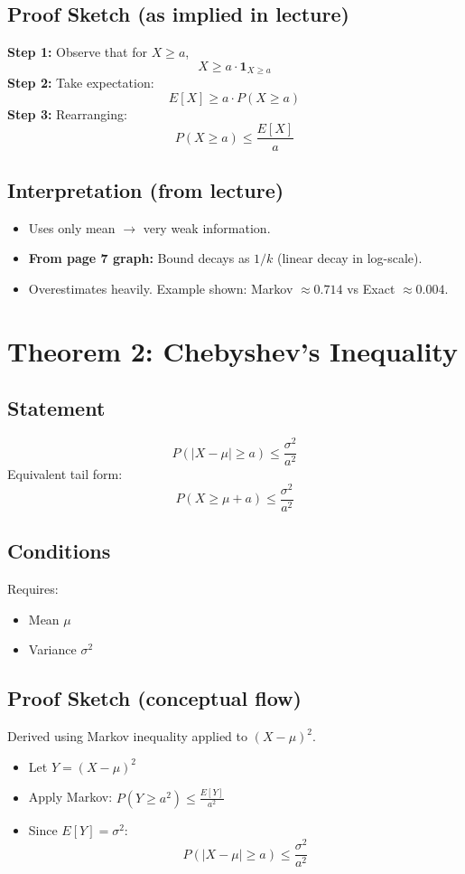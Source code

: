 \documentclass[11pt]{article}
\begin{document}
\subsection{Proof Sketch (as implied in lecture)}
\textbf{Step 1:} Observe that for $X \ge a$,
\[ X \ge a \cdot \mathbf{1}_{X \ge a} \]
\textbf{Step 2:} Take expectation:
\[ E[X] \ge a \cdot P(X \ge a) \]
\textbf{Step 3:} Rearranging:
\[ P(X \ge a) \le \frac{E[X]}{a} \]

\subsection{Interpretation (from lecture)}
\begin{itemize}
    \item Uses only mean $\rightarrow$ very weak information.
    \item \textbf{From page 7 graph:} Bound decays as $1/k$ (linear decay in log-scale).
    \item Overestimates heavily. Example shown: Markov $\approx 0.714$ vs Exact $\approx 0.004$.
\end{itemize}

\section{Theorem 2: Chebyshev’s Inequality}
\subsection{Statement}
\[ P(|X - \mu| \ge a) \le \frac{\sigma^2}{a^2} \]
Equivalent tail form:
\[ P(X \ge \mu + a) \le \frac{\sigma^2}{a^2} \]

\subsection{Conditions}
Requires:
\begin{itemize}
    \item Mean $\mu$
    \item Variance $\sigma^2$
\end{itemize}

\subsection{Proof Sketch (conceptual flow)}
Derived using Markov inequality applied to $(X - \mu)^2$.
\begin{itemize}
    \item Let $Y = (X - \mu)^2$
    \item Apply Markov: $P(Y \ge a^2) \le \frac{E[Y]}{a^2}$
    \item Since $E[Y] = \sigma^2$:
    \[ P(|X - \mu| \ge a) \le \frac{\sigma^2}{a^2} \]
\end{itemize}
\end{document}
